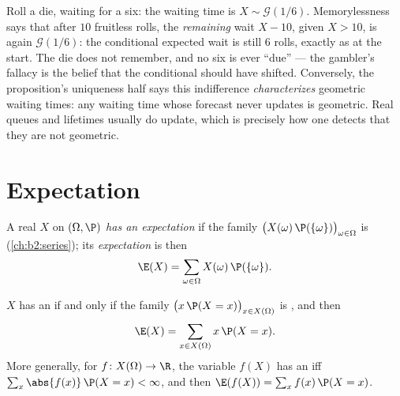 \begin{example}
Roll a die, waiting for a six: the waiting time is $X \sim
\mathcal G(1/6)$. Memorylessness says that after $10$
fruitless rolls, the \emph{remaining} wait $X - 10$, given
$X > 10$, is again $\mathcal G(1/6)$: the conditional
expected wait is still $6$ rolls, exactly as at the start.
The die does not remember, and no six is ever ``due'' --- the
gambler's fallacy is the belief that the conditional 
should have shifted. Conversely, the proposition's uniqueness
half says this indifference \emph{characterizes} geometric
waiting times: any waiting time whose forecast never updates
is geometric. Real queues and lifetimes usually do update,
which is precisely how one detects that they are not
geometric.
\end{example}

\section{Expectation}

\begin{definition}[Expectation]\label{def:b2:randomvar:expectation}
A real  $X$ on $(\Omega, \P)$ \emph{has an
expectation} if the family
$\bigl(X(\omega)\,\P(\{\omega\})\bigr)_{\omega \in \Omega}$ is
 (\cref{ch:b2:series}); its \emph{expectation} is then
\[
\E(X) = \sum_{\omega \in \Omega} X(\omega)\,\P(\{\omega\}) .
\]
\end{definition}

\begin{theorem}\label{thm:b2:randomvar:transfer}
$X$ has an  if and only if the family $\bigl(x\,\P(X =
x)\bigr)_{x \in X(\Omega)}$ is , and then
\[
\E(X) = \sum_{x \in X(\Omega)} x\,\P(X = x) .
\]
More generally, for $f \colon X(\Omega) \to \R$, the variable
$f(X)$ has an  iff $\sum_x \abs{f(x)}\,\P(X = x) <
\infty$, and then $\E(f(X)) = \sum_x f(x)\,\P(X = x)$.
\end{theorem}

